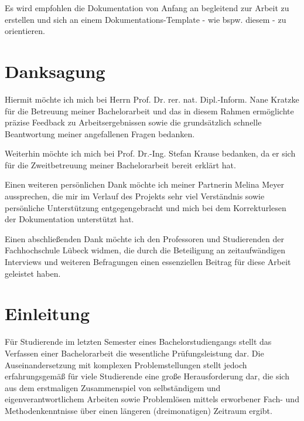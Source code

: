 \documentclass[bibliography=totoc,listof=totoc,BCOR=5mm,DIV=12,oneside]{scrbook}
\begin{document}
Es wird empfohlen die Dokumentation von Anfang an begleitend zur Arbeit zu erstellen und sich an einem Dokumentations-Template - wie bspw. diesem - zu orientieren.

\newpage


\newpage
\chapter*{Danksagung}
\par Hiermit möchte ich mich bei Herrn Prof. Dr. rer. nat. Dipl.-Inform. Nane Kratzke für die Betreuung meiner Bachelorarbeit und das in diesem Rahmen ermöglichte präzise Feedback zu Arbeitsergebnissen sowie die grundsätzlich schnelle Beantwortung meiner angefallenen Fragen bedanken.

\par \bigskip Weiterhin möchte ich mich bei Prof. Dr.-Ing. Stefan Krause bedanken, da er sich für die Zweitbetreuung meiner Bachelorarbeit bereit erklärt hat.

\par \bigskip Einen weiteren persönlichen Dank möchte ich meiner Partnerin Melina Meyer aussprechen, die mir im Verlauf des Projekts sehr viel Verständnis sowie persönliche Unterstützung entgegengebracht und mich bei dem Korrekturlesen der Dokumentation unterstützt hat.

\par \bigskip Einen abschließenden Dank möchte ich den Professoren und Studierenden der Fachhochschule Lübeck widmen, die durch die Beteiligung an zeitaufwändigen Interviews und weiteren Befragungen einen essenziellen Beitrag für diese Arbeit geleistet haben.

\tableofcontents
\newpage
\mainmatter
\pagestyle{plain}

\chapter{Einleitung}
\par Für Studierende im letzten Semester eines Bachelorstudiengangs stellt das Verfassen einer Bachelorarbeit die wesentliche Prüfungsleistung dar. 
Die Auseinandersetzung mit komplexen Problemstellungen stellt jedoch erfahrungsgemäß für viele Studierende eine große Herausforderung dar, die sich aus dem erstmaligen Zusammenspiel von selbständigem und eigenverantwortlichem Arbeiten sowie Problemlösen mittels erworbener Fach- und Methodenkenntnisse über einen längeren (dreimonatigen) Zeitraum ergibt.
\end{document}
